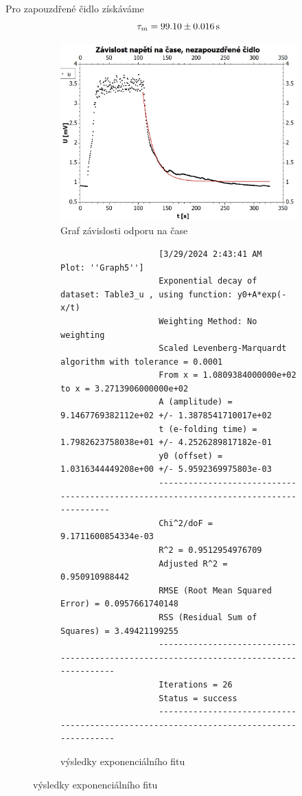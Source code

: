 \documentclass[czech,11pt,a4paper]{article}
\begin{document}
	Pro zapouzdřené čidlo získáváme 
	\begin{equation}
		\tau_m = 99.10 \pm 0.016 \,\rm s
	\end{equation}
	\begin{figure}[H]
		
		\begin{subfigure}{0.6\textwidth}
			\includegraphics[width=1\linewidth, ]{nezapouzdrene} 
			\caption{Graf závislosti odporu na čase}
			\label{fig:subim1}
		\end{subfigure}
		\begin{subfigure}{0.4\textwidth}
			{\tiny \begin{verbatim}
					[3/29/2024 2:43:41 AM	Plot: ''Graph5'']
					Exponential decay of dataset: Table3_u , using function: y0+A*exp(-x/t)
					Weighting Method: No weighting
					Scaled Levenberg-Marquardt algorithm with tolerance = 0.0001
					From x = 1.0809384000000e+02 to x = 3.2713906000000e+02
					A (amplitude) = 9.1467769382112e+02 +/- 1.3878541710017e+02
					t (e-folding time) = 1.7982623758038e+01 +/- 4.2526289817182e-01
					y0 (offset) = 1.0316344449208e+00 +/- 5.9592369975803e-03
					--------------------------------------------------------------------------------------
					Chi^2/doF = 9.1711600854334e-03
					R^2 = 0.9512954976709
					Adjusted R^2 = 0.950910988442
					RMSE (Root Mean Squared Error) = 0.0957661740148
					RSS (Residual Sum of Squares) = 3.49421199255
					---------------------------------------------------------------------------------------
					Iterations = 26
					Status = success
					---------------------------------------------------------------------------------------
			\end{verbatim}}
			\caption{výsledky exponenciálního fitu}
		\end{subfigure}
	\end{figure}
\end{document}
